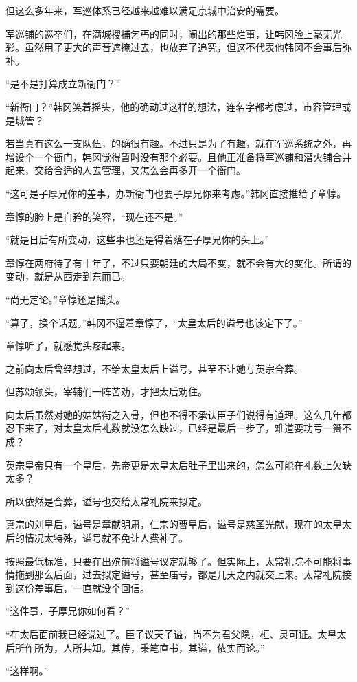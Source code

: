 但这么多年来，军巡体系已经越来越难以满足京城中治安的需要。

军巡铺的巡卒们，在满城搜捕乞丐的同时，闹出的那些烂事，让韩冈脸上毫无光彩。虽然用了更大的声音遮掩过去，也放弃了追究，但这不代表他韩冈不会事后弥补。

“是不是打算成立新衙门？”

“新衙门？”韩冈笑着摇头，他的确动过这样的想法，连名字都考虑过，市容管理或是城管？

若当真有这么一支队伍，的确很有趣。不过只是为了有趣，就在军巡系统之外，再增设个一个衙门，韩冈觉得暂时没有那个必要。且他正准备将军巡铺和潜火铺合并起来，交给合适的人去管理，又怎么会再多开一个衙门。

“这可是子厚兄你的差事，办新衙门也要子厚兄你来考虑。”韩冈直接推给了章惇。

章惇的脸上是自矜的笑容，“现在还不是。”

“就是日后有所变动，这些事也还是得着落在子厚兄你的头上。”

章惇在两府待了有十年了，不过只要朝廷的大局不变，就不会有大的变化。所谓的变动，就是从西走到东而已。

“尚无定论。”章惇还是摇头。

“算了，换个话题。”韩冈不逼着章惇了，“太皇太后的谥号也该定下了。”

章惇听了，就感觉头疼起来。

之前向太后曾经想过，不给太皇太后上谥号，甚至不让她与英宗合葬。

但苏颂领头，宰辅们一阵苦劝，才把太后劝住。

向太后虽然对她的姑姑衔之入骨，但也不得不承认臣子们说得有道理。这么几年都忍下来了，对太皇太后礼数就没怎么缺过，已经是最后一步了，难道要功亏一篑不成？

英宗皇帝只有一个皇后，先帝更是太皇太后肚子里出来的，怎么可能在礼数上欠缺太多？

所以依然是合葬，谥号也交给太常礼院来拟定。

真宗的刘皇后，谥号是章献明肃，仁宗的曹皇后，谥号是慈圣光献，现在的太皇太后的情况太特殊，谥号就不免让人费神了。

按照最低标准，只要在出殡前将谥号议定就够了。但实际上，太常礼院不可能将事情拖到那么后面，过去拟定谥号，甚至庙号，都是几天之内就交上来。太常礼院接到这份差事后，一直就没个回信。

“这件事，子厚兄你如何看？”

“在太后面前我已经说过了。臣子议天子谥，尚不为君父隐，桓、灵可证。太皇太后所作所为，人所共知。其传，秉笔直书，其谥，依实而论。”

“这样啊。”

